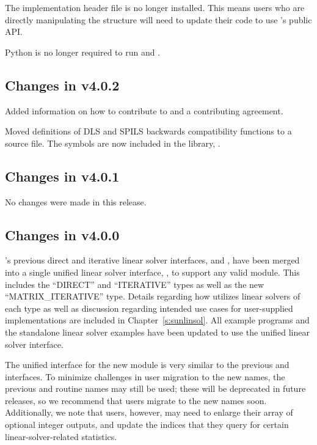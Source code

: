 The implementation header file  is no longer installed. This means users
who are directly manipulating the  structure will need to update their code
to use {\cvode}'s public API.

Python is no longer required to run  and .

\subsection*{Changes in v4.0.2}

Added information on how to contribute to {\sundials} and a contributing agreement.

Moved definitions of DLS and SPILS backwards compatibility functions to a source file.
The symbols are now included in the {\cvode} library, .

\subsection*{Changes in v4.0.1}

No changes were made in this release.

\subsection*{Changes in v4.0.0}

{\cvode}'s previous direct and iterative linear solver interfaces,
{\cvdls} and {\cvspils}, have been merged into a single unified linear
solver interface, {\cvls}, to support any valid {\sunlinsol} module.
This includes the ``DIRECT'' and ``ITERATIVE'' types as well as the new
``MATRIX\_ITERATIVE'' type. Details regarding how {\cvls} utilizes linear
solvers of each type as well as discussion regarding intended use cases for
user-supplied {\sunlinsol} implementations are included in
Chapter~\ref{s:sunlinsol}. All {\cvode} example programs and the standalone
linear solver examples have been updated to use the unified linear solver
interface.

The unified interface for the new {\cvls} module is very similar to the
previous {\cvdls} and {\cvspils} interfaces. To minimize challenges in user
migration to the new names, the previous {\CC} and {\F} routine names may still
be used; these will be deprecated in future releases, so we recommend that users
migrate to the new names soon. Additionally, we note that {\F} users, however,
may need to enlarge their  array of optional integer outputs, and
update the indices that they query for certain linear-solver-related
statistics.

